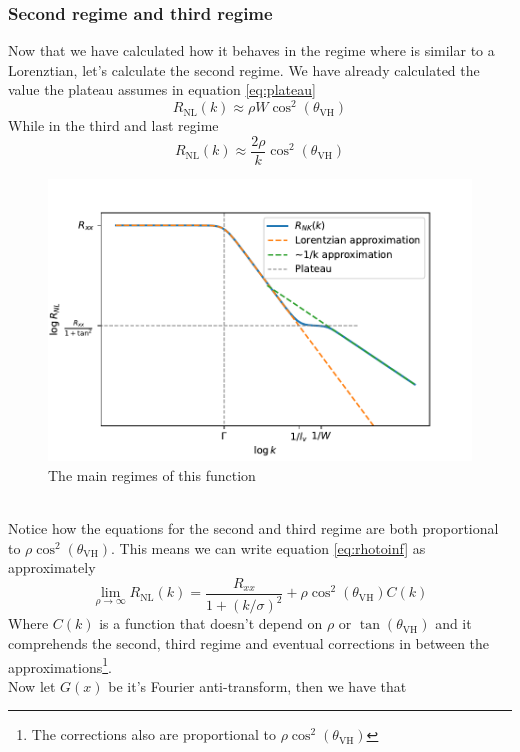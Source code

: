 \subsubsection*{Second regime and third regime}
Now that we have calculated how it behaves in the regime where is similar to a Lorenztian, let's calculate the second regime. We have already calculated the value the plateau assumes in equation \ref{eq:plateau} 
\begin{equation}
    R_{\textrm{NL}}(k)\approx \rho W\cos^2(\theta_{\textrm{VH}})
    \label{eq:second_regime}
\end{equation}
While in the third and last regime 
\begin{equation}
    R_{\textrm{NL}}(k)\approx \frac{2\rho}k \cos^2(\theta_{\textrm{VH}})
    \label{eq:third_regime}
\end{equation}
\begin{figure}[h!]
    \centering
    \includegraphics[width=\linewidth]{Immagini/rnl/rho3.pdf}
    \caption{The main regimes of this function}
    \label{fig:rho3}
\end{figure}\\
Notice how the equations for the second and third regime are both proportional to $\rho\cos^2(\theta_{\textrm{VH}})$. This means we can write equation \ref{eq:rhotoinf} as approximately
\begin{equation}
    \lim_{\rho\to\infty} R_{\textrm{NL}}(k)=\frac{R_{xx}}{1+(k/\sigma)^2} + \rho\cos^2(\theta_{\textrm{VH}}) C(k)
    \label{eq:rhotoinf2}
\end{equation}
Where $C(k)$ is a function that doesn't depend on $\rho$ or $\tan(\theta_{\textrm{VH}})$ and it comprehends the second, third regime and eventual corrections in between the approximations\footnote{The corrections also are proportional to $\rho\cos^2(\theta_{\textrm{VH}})$}.\\%
Now let $G(x)$ be it's Fourier anti-transform, then we have that 

